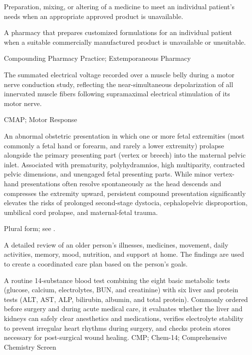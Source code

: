  Preparation, mixing, or altering of a medicine to meet an individual patient's needs when an appropriate approved product is unavailable.

 A pharmacy that prepares customized formulations for an individual patient when a suitable commercially manufactured product is unavailable or unsuitable.

\synonyms
Compounding Pharmacy Practice; Extemporaneous Pharmacy

 The summated electrical voltage recorded over a muscle belly during a motor nerve conduction study, reflecting the near-simultaneous depolarization of all innervated muscle fibers following supramaximal electrical stimulation of its motor nerve.

\synonyms
CMAP; Motor Response

 An abnormal obstetric presentation in which one or more fetal extremities (most commonly a fetal hand or forearm, and rarely a lower extremity) prolapse alongside the primary presenting part (vertex or breech) into the maternal pelvic inlet. Associated with prematurity, polyhydramnios, high multiparity, contracted pelvic dimensions, and unengaged fetal presenting parts. While minor vertex-hand presentations often resolve spontaneously as the head descends and compresses the extremity upward, persistent compound presentation significantly elevates the risks of prolonged second-stage dystocia, cephalopelvic disproportion, umbilical cord prolapse, and maternal-fetal trauma.

 Plural form; see .

 A detailed review of an older person's illnesses, medicines, movement, daily activities, memory, mood, nutrition, and support at home. The findings are used to create a coordinated care plan based on the person's goals.

 A routine 14-substance blood test combining the eight basic metabolic tests (glucose, calcium, electrolytes, BUN, and creatinine) with six liver and protein tests (ALT, AST, ALP, bilirubin, albumin, and total protein). Commonly ordered before surgery and during acute medical care, it evaluates whether the liver and kidneys can safely clear anesthetics and medications, verifies electrolyte stability to prevent irregular heart rhythms during surgery, and checks protein stores necessary for post-surgical wound healing.
\synonyms
CMP; Chem-14; Comprehensive Chemistry Screen

